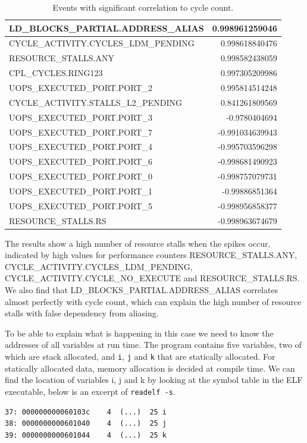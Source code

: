 \documentclass[a4paper,10pt,twocolumn,twoside]{article}
\begin{document}
\begin{table}[h]
  \caption{Events with significant correlation to cycle count.}
  \label{tab:loopcorrelation}
  \centering
  \scriptsize
  \begin{tabular}{|l|n{2}{3}|}
    \toprule
      LD_BLOCKS_PARTIAL.ADDRESS_ALIAS & 0.998961259046 \\ \midrule
      CYCLE_ACTIVITY.CYCLES_LDM_PENDING & 0.998618840476 \\ \midrule
      RESOURCE_STALLS.ANY & 0.998582438059 \\ \midrule
      CPL_CYCLES.RING123 & 0.997305209986 \\ \midrule
      UOPS_EXECUTED_PORT.PORT_2 & 0.995814514248 \\ \midrule
      CYCLE_ACTIVITY.STALLS_L2_PENDING & 0.841261809569 \\ \midrule
      UOPS_EXECUTED_PORT.PORT_3 & -0.9780404694 \\ \midrule
      UOPS_EXECUTED_PORT.PORT_7 & -0.991034639943 \\ \midrule
      UOPS_EXECUTED_PORT.PORT_4 & -0.995703596298 \\ \midrule
      UOPS_EXECUTED_PORT.PORT_6 & -0.998681490923 \\ \midrule
      UOPS_EXECUTED_PORT.PORT_0 & -0.998757079731 \\ \midrule
      UOPS_EXECUTED_PORT.PORT_1 & -0.99886851364 \\ \midrule
      UOPS_EXECUTED_PORT.PORT_5 & -0.998956858377 \\ \midrule
      RESOURCE_STALLS.RS & -0.998963674679 \\
    \bottomrule
  \end{tabular}
  \npnoround
\end{table}

The results show a high number of resource stalls when the spikes occur, indicated by high values for performance counters \small{RESOURCE\_STALLS.ANY}, \small{CYCLE\_ACTIVITY.CYCLES\_LDM\_PENDING}, \small{CYCLE\_ACTIVITY.CYCLE\_NO\_EXECUTE} and \small{RESOURCE\_STALLS.RS}.
We also find that \small{LD\_BLOCKS\_PARTIAL.ADDRESS\_ALIAS} correlates almost perfectly with cycle count, which can explain the high number of resource stalls with false dependency from aliasing.

To be able to explain what is happening in this case we need to know the addresses of all variables at run time.
The program contains five variables, two of which are stack allocated, and \texttt{i}, \texttt{j} and \texttt{k} that are statically allocated.
For statically allocated data, memory allocation is decided at compile time.
We can find the location of variables i, j and k by looking at the symbol table in the ELF executable, below is an excerpt of \lstinline$readelf -s$.
\begin{lstlisting}[float=h, basicstyle=\small]
37: 000000000060103c    4  (...)  25 i
38: 0000000000601040    4  (...)  25 j
39: 0000000000601044    4  (...)  25 k
\end{lstlisting}
\end{document}
